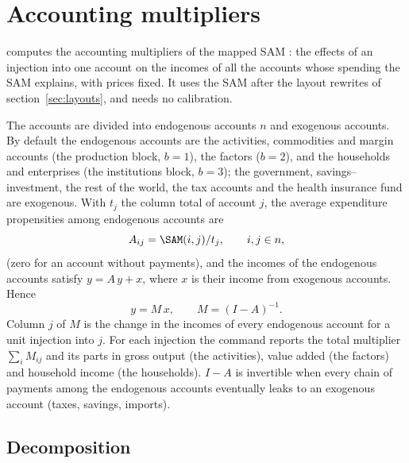 \section{Accounting multipliers}\label{sec:multipliers}

 computes the accounting multipliers of the mapped SAM
\citep{pyatt1979}: the effects of an injection into one account on the incomes
of all the accounts whose spending the SAM explains, with prices fixed. It uses
the SAM after the layout rewrites of section~\ref{sec:layouts}, and needs no
calibration.

The accounts are divided into endogenous accounts $n$ and exogenous accounts.
By default the endogenous accounts are the activities, commodities and margin
accounts (the production block, $b = 1$), the factors ($b = 2$), and the
households and enterprises (the institutions block, $b = 3$); the government,
savings--investment, the rest of the world, the tax accounts and the health
insurance fund are exogenous. With $t_j$ the column total of account $j$, the
average expenditure propensities among endogenous accounts are
\begin{equation*}
A_{ij} = \SAM(i, j) / t_j, \qquad i, j \in n,
\end{equation*}
(zero for an account without payments), and the incomes of the endogenous
accounts satisfy $y = A\,y + x$, where $x$ is their income from exogenous
accounts. Hence
\begin{equation*}
y = M\,x, \qquad M = (I - A)^{-1}.
\end{equation*}
Column $j$ of $M$ is the change in the incomes of every endogenous account for
a unit injection into $j$. For each injection the command reports the total
multiplier $\sum_i M_{ij}$ and its parts in gross output (the activities),
value added (the factors) and household income (the households). $I - A$ is
invertible when every chain of payments among the endogenous accounts
eventually leaks to an exogenous account (taxes, savings, imports).

\subsection{Decomposition}\label{sec:decomposition}

